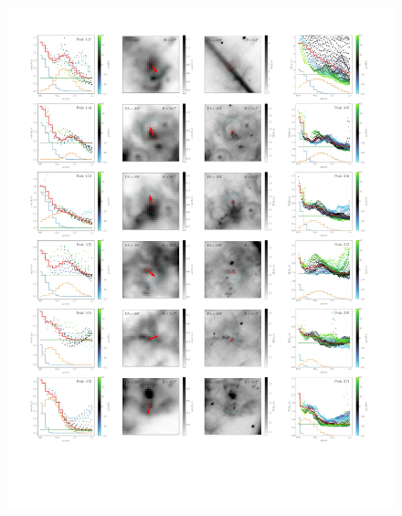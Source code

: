 \documentclass{book}
\begin{document}
\begin{figure}[h!]
    \centering
    \includegraphics[width=1.2\textwidth]{imagenes Chapter 4/ajustes_075324-2.pdf}
\end{figure}
\end{document}
